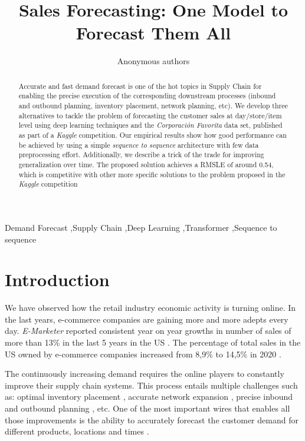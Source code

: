 \documentclass{elsarticle}
\begin{document}
	
	\begin{frontmatter}

		\title{Sales Forecasting: One Model to Forecast Them All}
		
		\author{Anonymous authors}


		\begin{abstract}
			Accurate and fast demand forecast is one of the hot topics in Supply Chain for enabling the precise execution of the corresponding downstream processes (inbound and outbound planning, inventory placement, network planning, etc). We develop three alternatives to tackle the problem of forecasting the customer sales at day/store/item level using deep learning techniques and the \textit{Corporación Favorita} data set, published as part of a \textit{Kaggle} competition. Our empirical results show how good performance can be achieved by using a simple \textit{sequence to sequence} architecture with few data preprocessing effort. Additionally, we describe a trick of the trade for improving generalization over time. The proposed solution achieves a RMSLE of around 0.54, which is competitive with other more specific solutions to the problem proposed in the \textit{Kaggle} competition
		\end{abstract}
		
		\begin{keyword}
			Demand Forecast \sep Supply Chain \sep Deep Learning \sep Transformer \sep Sequence to sequence
		\end{keyword}
		
	\end{frontmatter}
	
	\linenumbers
	
	\section{Introduction}
	We have observed how the retail industry economic activity is turning online. In the last years, e-commerce companies are gaining more and more adepts every day. \textit{E-Marketer} reported consistent year on year growths in number of sales of more than 13\% in the last 5 years in the US \cite{emarketer2019, emarketer2020}. The percentage of total sales in the US owned by e-commerce companies increased from 8,9\% to 14,5\% in 2020 \cite{emarketer2019, emarketer2020}.
	
	The continuously increasing demand requires the online players to constantly improve their supply chain systems. This process entails multiple challenges such as: optimal inventory placement \cite{graves2008}, accurate network expansion \cite{hossein2017}, precise inbound and outbound planning \cite{kaipia2009}, etc. One of the most important wires that enables all those improvements is the ability to accurately forecast the customer demand for different products, locations and times \cite{forslund2007}.  
	
\end{document}
